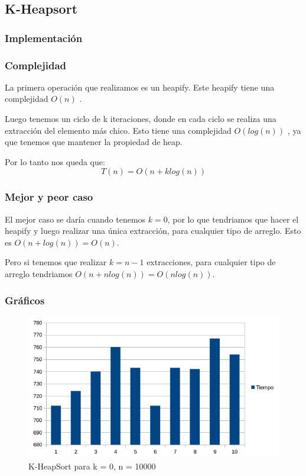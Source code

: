 \newpage
\subsection{K-Heapsort}

\subsubsection{Implementación}

\subsubsection{Complejidad}
La primera operación que realizamos es un heapify. Este heapify tiene una complejidad $O(n)$ \cite{STD_MAKEHEAP}.

Luego tenemos un ciclo de k iteraciones, donde en cada ciclo se realiza una extracción del elemento más chico. Esto tiene una complejidad $O(log(n))$ \cite{STD_POPHEAP}, ya que tenemos que mantener la propiedad de heap.

Por lo tanto nos queda que:
$$ T(n) = O(n + klog(n)) $$

\subsubsection{Mejor y peor caso}
El mejor caso se daría cuando tenemos $k = 0$, por lo que tendriamos que hacer el heapify y luego realizar una única extracción, para cualquier tipo de arreglo. Esto es $O(n + log(n)) = O(n)$.

Pero si tenemos que realizar $k = n-1$ extracciones, para cualquier tipo de arreglo tendriamos $O(n + nlog(n)) = O(nlog(n)) $.

\subsubsection{Gráficos}
\begin{figure}[H]
\centering
\includegraphics[width=\textwidth]{KZero/KHeapSortK0_Png.png}
\caption{K-HeapSort para k = 0, n = 10000}
\end{figure}

